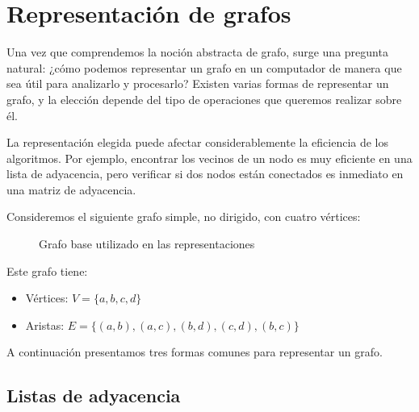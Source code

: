 

\section{Representación de grafos}

Una vez que comprendemos la noción abstracta de grafo, surge una pregunta natural: ¿cómo podemos representar un grafo en un computador de manera que sea útil para analizarlo y procesarlo? 
Existen varias formas de representar un grafo, y la elección depende del tipo de operaciones que queremos realizar sobre él.

La representación elegida puede afectar considerablemente la eficiencia de los algoritmos. Por ejemplo, encontrar los vecinos de un nodo es muy eficiente en una lista de adyacencia, pero verificar si dos nodos están conectados es inmediato en una matriz de adyacencia. 


Consideremos el siguiente grafo simple, no dirigido, con cuatro v\'ertices:
\begin{figure}[h]
\centering
{}
\caption{Grafo base utilizado en las representaciones}
\label{fig:grafo-representaciones}
\end{figure}

Este grafo tiene:
\begin{itemize}
  \item V\'ertices: $V = \{a, b, c, d\}$
  \item Aristas: $E = \{(a,b), (a,c), (b,d), (c,d), (b,c)\}$
\end{itemize}
A continuaci\'on presentamos tres formas comunes para representar un grafo.

\subsection{Listas de adyacencia}

